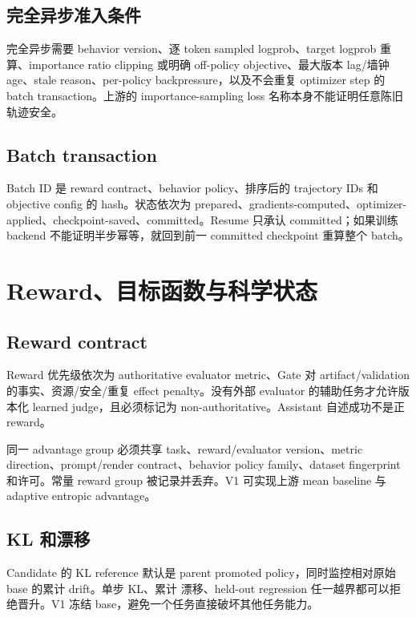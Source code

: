 \documentclass[UTF8,11pt,a4paper]{ctexart}
\begin{document}
\subsection{完全异步准入条件}

完全异步需要 behavior version、逐 token sampled logprob、target logprob 重算、importance ratio clipping 或明确
off-policy objective、最大版本 lag/墙钟 age、stale reason、per-policy backpressure，以及不会重复 optimizer step
的 batch transaction。上游的 importance-sampling loss 名称本身不能证明任意陈旧轨迹安全。

\subsection{Batch transaction}

Batch ID 是 reward contract、behavior policy、排序后的 trajectory IDs 和 objective config 的 hash。状态依次为
prepared、gradients-computed、optimizer-applied、checkpoint-saved、committed。Resume 只承认 committed；如果训练
backend 不能证明半步幂等，就回到前一 committed checkpoint 重算整个 batch。

\section{Reward、目标函数与科学状态}

\subsection{Reward contract}

Reward 优先级依次为 authoritative evaluator metric、Gate 对 artifact/validation 的事实、资源/安全/重复 effect
penalty。没有外部 evaluator 的辅助任务才允许版本化 learned judge，且必须标记为 non-authoritative。Assistant
自述成功不是正 reward。

同一 advantage group 必须共享 task、reward/evaluator version、metric direction、prompt/render contract、behavior
policy family、dataset fingerprint 和许可。常量 reward group 被记录并丢弃。V1 可实现上游 mean baseline 与
adaptive entropic advantage。

\subsection{KL 和漂移}

Candidate 的 KL reference 默认是 parent promoted policy，同时监控相对原始 base 的累计 drift。单步 KL、累计
漂移、held-out regression 任一越界都可以拒绝晋升。V1 冻结 base，避免一个任务直接破坏其他任务能力。
\end{document}

